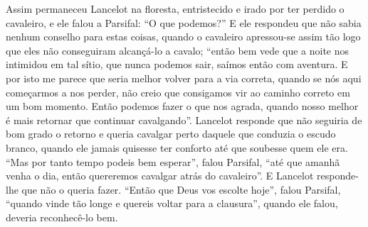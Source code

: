 Assim permaneceu Lancelot na floresta, entristecido e irado por ter perdido o
cavaleiro, e ele falou a Parsifal: “O que podemos?” E ele respondeu que não
sabia nenhum conselho para estas coisas, quando o cavaleiro apressou-se assim
tão logo que eles não conseguiram alcançá-lo a cavalo; “então bem vede que a
noite nos intimidou em tal sítio, que nunca podemos sair, saímos então com
aventura. E por isto me parece que seria melhor volver para a via correta,
quando se nós aqui começarmos a nos perder, não creio que consigamos vir ao
caminho correto em um bom momento. Então podemos fazer o que nos agrada, quando
nosso melhor é mais retornar que continuar cavalgando”. Lancelot responde que
não seguiria de bom grado o retorno e queria cavalgar perto daquele que
conduzia o escudo branco, quando ele jamais quisesse ter conforto até que
soubesse quem ele era. “Mas por tanto tempo podeis bem esperar”, falou
Parsifal, “até que amanhã venha o dia, então quereremos cavalgar atrás do
cavaleiro”. E Lancelot responde-lhe que não o queria fazer. “Então que Deus
vos escolte hoje”, falou Parsifal, “quando vinde tão longe e quereis voltar
para a clausura”, quando ele falou, deveria reconhecê-lo bem. 

